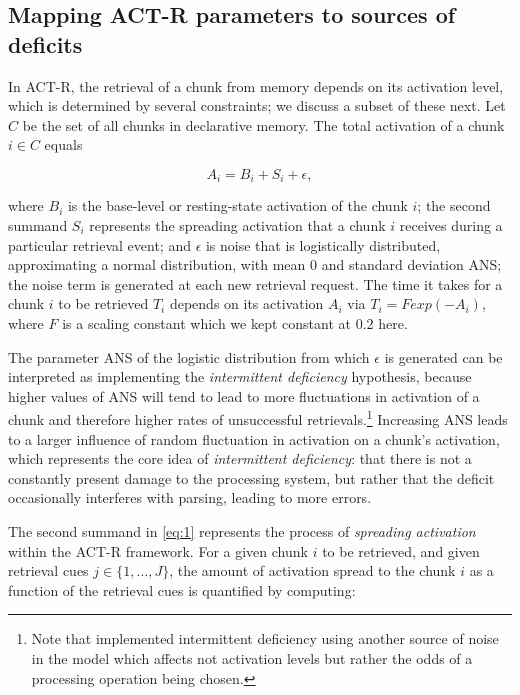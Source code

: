 \documentclass{cambridge7A}\usepackage[]{graphicx}\usepackage[]{color}
\begin{document}
\subsection{Mapping ACT-R parameters to sources of deficits}

In ACT-R, the retrieval of a chunk from memory depends on its activation level, which is determined by several constraints; we discuss a subset of these next. 
Let $C$ be the set of all chunks in declarative memory. The total activation of a chunk $i \in C$ equals

\begin{equation}\label{eq:1}
A_i = B_i + S_i + \epsilon,
\end{equation}

\noindent
where $B_i$ is the base-level or resting-state activation of the chunk $i$; the second summand $S_i$ represents the spreading activation that a chunk $i$ receives during a particular retrieval event; 
and $\epsilon$ is noise that is logistically distributed, approximating a normal distribution, with mean $0$ and standard deviation ANS; the noise term is generated at each new retrieval request.
The time it takes for a chunk $i$ to be retrieved $T_i$ depends on its activation $A_i$ via $T_i = F exp(-A_i)$, where $F$ is a scaling constant which we kept constant at $0.2$ here.

The parameter ANS of the logistic distribution from which $\epsilon$ is generated can be interpreted as implementing the \emph{intermittent deficiency} hypothesis, because higher values of ANS will tend to lead to more fluctuations in activation of a chunk and therefore higher rates of unsuccessful retrievals.\footnote{Note that \cite{PatilEtAl2016} implemented intermittent deficiency using another source of noise in the model which affects not activation levels but rather the odds of a processing operation being chosen.} 
Increasing ANS leads to a larger influence of random fluctuation in activation on a chunk's activation, which represents the core idea of \emph{intermittent deficiency}: that there is not a constantly present damage to the processing system, but rather that the deficit occasionally interferes with parsing, leading to more errors.

The second summand in \eqref{eq:1} represents the process of \emph{spreading activation} within the ACT-R framework. For a given chunk $i$ to be retrieved, and given retrieval cues $j \in \{1, \ldots, J\}$, the amount of activation spread to the chunk $i$ as a function of the retrieval cues is quantified by computing: 
\end{document}
